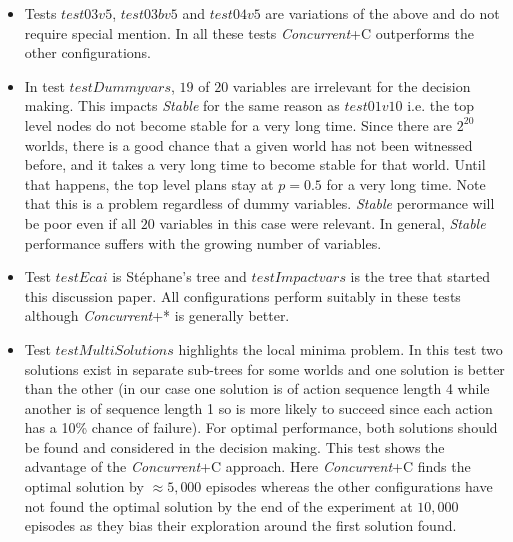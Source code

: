 \documentclass[a4paper]{article}
\newcommand{\cc}{\emph{Concurrent}\xspace}
\newcommand{\st}{\emph{Stable}\xspace}
\newcommand{\stephane}{{St\'ephane}\xspace}
\begin{document}
\begin{itemize}
In both tests, {\cc}+P is incapable of finding the solution before the experiment end. Importantly, {\cc}+C does better and finds a solution fairly quickly. However it does not immediately commit to the solution and still spends significant time in exploring towards full coverage. Instead {\cc}+C performance steadily improves as better overall coverage is achieved. At first this may seem wasteful. After all why spend resources exploring when you have already found a solution. The reason is that the found solution may not be optimal. In the general case, we are interested in finding the optimal solution that may in fact lie in another sub-tree. This, we will argue is an important advantage of {\cc}+C and why it is better suited for worlds where multiple solutions exists. {\st}+P/C and {\cc}+P all suffer form the local minima problem as they immediately bias exploration in favour of the goal/plan sub-tree that holds the first found solution.

\item Tests $test03v5$, $test03bv5$ and $test04v5$ are variations of the above and do not require special mention. In all these tests {\cc}+C outperforms the other configurations.

\item In test $testDummyvars$, $19$ of $20$ variables are irrelevant for the decision making. This impacts \st for the same reason as $test01v10$ i.e. the top level nodes do not become stable for a very long time. Since there are $2^{20}$ worlds, there is a good chance that a given world has not been witnessed before, and it takes a very long time to become stable for that world. Until that happens, the top level plans stay at $p=0.5$ for a very long time. Note that this is a problem regardless of dummy variables. \st perormance will be poor even if all $20$ variables in this case were relevant. In general, \st performance suffers with the growing number of variables.

\item Test $testEcai$ is {\stephane}'s tree and $testImpactvars$ is the tree that started this discussion paper. All configurations perform suitably in these tests although {\cc}+* is generally better.

\item Test $testMultiSolutions$ highlights the local minima problem. In this test two solutions exist in separate sub-trees for some worlds and one solution is better than the other (in our case one solution is of action sequence length 4 while another is of sequence length 1 so is more likely to succeed since each action has a 10\% chance of failure). For optimal performance, both solutions should be found and considered in the decision making. This test shows the advantage of the {\cc}+C approach. Here {\cc}+C finds the optimal solution by $\approx5,000$ episodes whereas the other configurations have not found the optimal solution by the end of the experiment at $10,000$ episodes as they bias their exploration around the first solution found.
\end{itemize}
\end{document}
